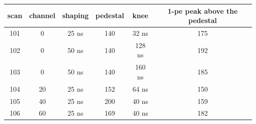 \begin{tabular}{cccccc}
\toprule
scan & channel & shaping & pedestal & knee & 1-pe peak above the pedestal \\
\midrule
101 & 0 & 25 ns & 140 & 32 ns & 175 \\
102 & 0 & 50 ns & 140 & 128 ns & 192 \\
103 & 0 & 50 ns & 140 & 160 ns & 185 \\
104 & 20 & 25 ns & 152 & 64 ns & 150 \\
105 & 40 & 25 ns & 200 & 40 ns & 159 \\
106 & 60 & 25 ns & 169 & 40 ns & 182 \\
\bottomrule
\end{tabular}
